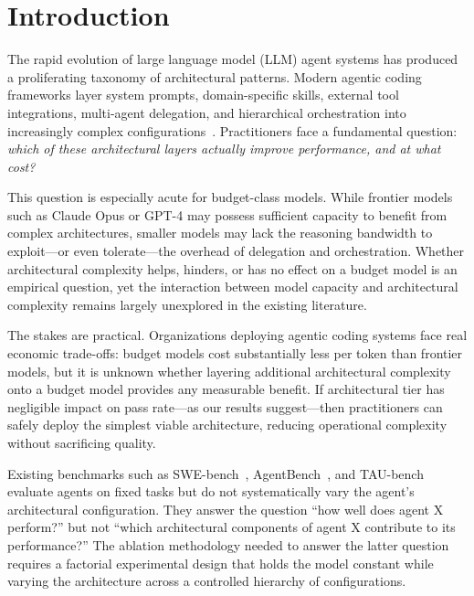 \documentclass[11pt]{article}
\begin{document}
\section{Introduction}
\label{sec:introduction}

The rapid evolution of large language model (LLM) agent systems has produced a
proliferating taxonomy of architectural patterns. Modern agentic coding
frameworks layer system prompts, domain-specific skills, external tool
integrations, multi-agent delegation, and hierarchical orchestration into
increasingly complex configurations~\cite{anthropic2024claude, liu2023agentbench}.
Practitioners face a fundamental question: \emph{which of these architectural
layers actually improve performance, and at what cost?}

This question is especially acute for budget-class models. While frontier
models such as Claude Opus or GPT-4 may possess sufficient capacity to benefit
from complex architectures, smaller models may lack the reasoning bandwidth to
exploit---or even tolerate---the overhead of delegation and orchestration.
Whether architectural complexity helps, hinders, or has no effect on a budget
model is an empirical question, yet the interaction between model capacity and
architectural complexity remains largely unexplored in the existing literature.

The stakes are practical. Organizations deploying agentic coding systems face
real economic trade-offs: budget models cost substantially less per token than
frontier models, but it is unknown whether layering additional architectural
complexity onto a budget model provides any measurable benefit. If
architectural tier has negligible impact on pass rate---as our results
suggest---then practitioners can safely deploy the simplest viable
architecture, reducing operational complexity without sacrificing quality.

Existing benchmarks such as SWE-bench~\cite{jimenez2024swebench},
AgentBench~\cite{liu2023agentbench}, and TAU-bench~\cite{yao2024taubench}
evaluate agents on fixed tasks but do not systematically vary the agent's
architectural configuration. They answer the question ``how well does agent X
perform?'' but not ``which architectural components of agent X contribute to
its performance?'' The ablation methodology needed to answer the latter
question requires a factorial experimental design that holds the model constant
while varying the architecture across a controlled hierarchy of configurations.
\end{document}
